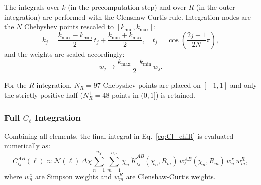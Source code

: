 The integrals over $k$ (in the precomputation step) and over $R$ (in the
outer integration) are performed with the Clenshaw-Curtis rule. Integration
nodes are the $N$ Chebyshev points rescaled to $[k_{\min}, k_{\max}]$:
\begin{equation}
    k_j = \frac{k_{\max}-k_{\min}}{2}\,t_j + \frac{k_{\min}+k_{\max}}{2},
    \quad t_j = \cos\!\left(\frac{2j+1}{2N}\pi\right),
\end{equation}
and the weights are scaled accordingly:
\begin{equation}
    w_j \to \frac{k_{\max}-k_{\min}}{2}\,w_j.
\end{equation}

For the $R$-integration, $N_R = 97$ Chebyshev points are placed on $[-1,1]$
and only the strictly positive half ($N_R^+ = 48$ points in $(0,1]$) is
retained.

\subsubsection{Full $C_\ell$ Integration}

Combining all elements, the final integral in Eq.~\eqref{eq:Cl_chiR} is
evaluated numerically as:
\begin{equation}
    C^{AB}_{ij}(\ell) \approx
    \mathcal{N}(\ell)\,\Delta\chi
    \sum_{n=1}^{n_\chi} \sum_{m=1}^{n_R}
    \chi_n\,\tilde{K}^{AB}_{ij}(\chi_n, R_m)\,
    w^{AB}_\ell(\chi_n, R_m)\,
    w^\chi_n\,w^R_m,
    \label{eq:Cl_numerical}
\end{equation}
where $w^\chi_n$ are Simpson weights and $w^R_m$ are Clenshaw-Curtis weights.